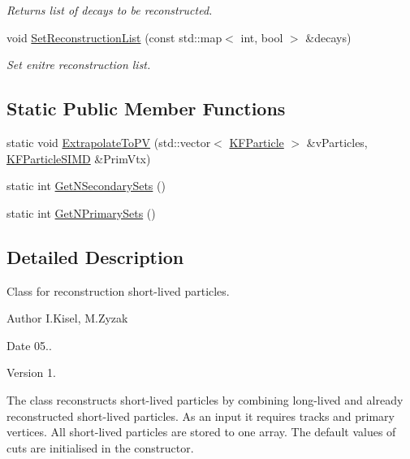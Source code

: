 \begin{DoxyCompactItemize}
\begin{DoxyCompactList}\small\item\em Returns list of decays to be reconstructed. \end{DoxyCompactList}\item 
void \hyperlink{classKFParticleFinder_a2b8ec392a4b35151c51978791bc0164e}{Set\+Reconstruction\+List} (const std\+::map$<$ int, bool $>$ \&decays)\hypertarget{classKFParticleFinder_a2b8ec392a4b35151c51978791bc0164e}{}\label{classKFParticleFinder_a2b8ec392a4b35151c51978791bc0164e}

\begin{DoxyCompactList}\small\item\em Set enitre reconstruction list. \end{DoxyCompactList}\end{DoxyCompactItemize}
\subsection*{Static Public Member Functions}
\begin{DoxyCompactItemize}
\item 
static void \hyperlink{classKFParticleFinder_a370264d09a6bfbb50da1113abd0db15a}{Extrapolate\+To\+PV} (std\+::vector$<$ \hyperlink{classKFParticle}{K\+F\+Particle} $>$ \&v\+Particles, \hyperlink{classKFParticleSIMD}{K\+F\+Particle\+S\+I\+MD} \&Prim\+Vtx)
\item 
static int \hyperlink{classKFParticleFinder_a429efd147794ece6aff40e07a4ffbbb3}{Get\+N\+Secondary\+Sets} ()
\item 
static int \hyperlink{classKFParticleFinder_af697419ca53253eba616174aecb7cb01}{Get\+N\+Primary\+Sets} ()
\end{DoxyCompactItemize}


\subsection{Detailed Description}
Class for reconstruction short-\/lived particles. 

\begin{DoxyAuthor}{Author}
I.\+Kisel, M.\+Zyzak 
\end{DoxyAuthor}
\begin{DoxyDate}{Date}
05.. 
\end{DoxyDate}
\begin{DoxyVersion}{Version}
1.
\end{DoxyVersion}
The class reconstructs short-\/lived particles by combining long-\/lived and already reconstructed short-\/lived particles. As an input it requires tracks and primary vertices. All short-\/lived particles are stored to one array. The default values of cuts are initialised in the constructor. 


